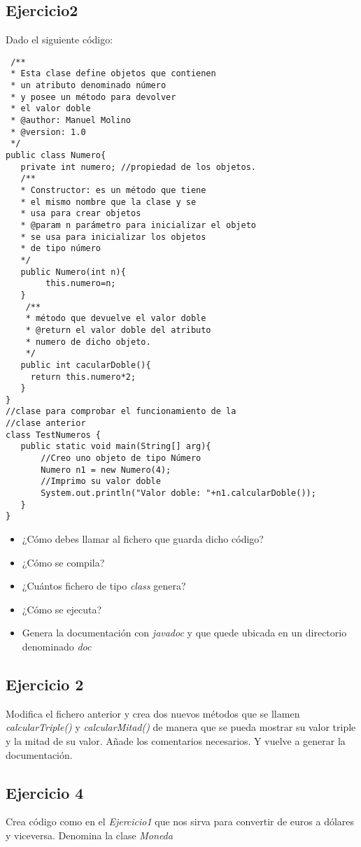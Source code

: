 \documentclass[4paper]{article}
\begin{document}
\subsection{Ejercicio2}  
Dado el siguiente código:
\begin{verbatim}
 /**
 * Esta clase define objetos que contienen 
 * un atributo denominado número
 * y posee un método para devolver
 * el valor doble
 * @author: Manuel Molino
 * @version: 1.0
 */
public class Numero{
   private int numero; //propiedad de los objetos.
   /**
   * Constructor: es un método que tiene
   * el mismo nombre que la clase y se
   * usa para crear objetos
   * @param n parámetro para inicializar el objeto
   * se usa para inicializar los objetos
   * de tipo número
   */
   public Numero(int n){
        this.numero=n;
   }
    /**
    * método que devuelve el valor doble
    * @return el valor doble del atributo
    * numero de dicho objeto.
    */
   public int cacularDoble(){
     return this.numero*2;
   }
}
//clase para comprobar el funcionamiento de la 
//clase anterior
class TestNumeros {
   public static void main(String[] arg){
       //Creo uno objeto de tipo Número
       Numero n1 = new Numero(4);
       //Imprimo su valor doble
       System.out.println("Valor doble: "+n1.calcularDoble());
   }
}
\end{verbatim}
\newpage
\begin{itemize}
\item ¿Cómo debes llamar al fichero que guarda dicho código?
\item ¿Cómo se compila? 
\item ¿Cuántos fichero de tipo \emph{class} genera?
\item ¿Cómo se ejecuta?
\item Genera la documentación con \emph{javadoc} y que quede ubicada en un directorio denominado \emph{doc}
\end{itemize}

\subsection{Ejercicio 2}
Modifica el fichero anterior y crea dos nuevos métodos que se llamen \emph{calcularTriple()} y \emph{calcularMitad()} de manera que se pueda mostrar su valor triple y la mitad de su valor. Añade los comentarios necesarios. Y vuelve a generar la documentación.

\subsection{Ejercicio 4}
Crea código como en el \emph{Ejercicio1} que nos sirva para convertir de euros a dólares y viceversa. Denomina la clase \emph{Moneda}
\end{document}
